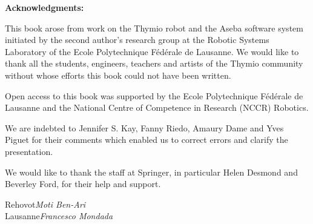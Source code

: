 \bigskip

\noindent\textbf{Acknowledgments:}

This book arose from work on the Thymio robot and the Aseba software system initiated by the second author's research group at the Robotic Systems Laboratory of the Ecole Polytechnique F\'{e}d\'{e}rale de Lausanne. We would like to thank all the students, engineers, teachers and artists of the Thymio community without whose efforts this book could not have been written.

Open access to this book was supported by the Ecole Polytechnique F\'{e}d\'{e}rale de Lausanne and the National Centre of Competence in Research (NCCR) Robotics.

We are indebted to Jennifer S. Kay, Fanny Riedo, Amaury Dame and Yves Piguet for their comments which enabled us to correct errors and clarify the presentation.

We would like to thank the staff at Springer, in particular Helen Desmond and Beverley Ford, for their help and support.

\bigskip

\begin{flushright}\noindent
Rehovot\hfill {\it Moti Ben-Ari}\\
Lausanne\hfill {\it Francesco Mondada}\\
\end{flushright}
 
\tableofcontents

